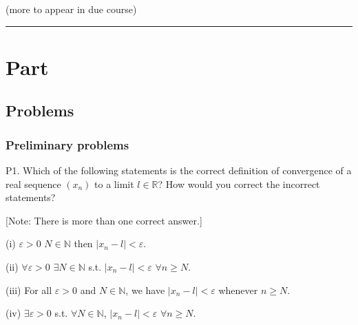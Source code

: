 \documentclass[letterpaper,10pt,english]{jupyterBook}
\begin{document}
\sphinxAtStartPar
{\hyperref[\detokenize{Solutions-upto46:sol}]{}} (more to appear in due course) 
  {\hyperref[\detokenize{Solutions-upto46:ch1sol}]{}} 
  {\hyperref[\detokenize{Solutions-upto46:ch2sol}]{}} 
  {\hyperref[\detokenize{Solutions-upto46:ch3sol}]{}} 
  {\hyperref[\detokenize{Solutions-upto46:ch4sol}]{}} 




\bigskip\hrule\bigskip


\sphinxstepscope


\part{Part}

\sphinxstepscope


\chapter{Problems}
\label{\detokenize{Problems:problems}}\label{\detokenize{Problems:prob}}\label{\detokenize{Problems::doc}}

\section{Preliminary problems}
\label{\detokenize{Problems:preliminary-problems}}\label{\detokenize{Problems:ch1prob}}\label{\detokenize{Problems:p1}}
\sphinxAtStartPar
P1.
Which of the following statements is the correct definition of convergence of a real sequence \((x_n)\) to a limit \(l\in\mathbb{R}\)? How would you correct the incorrect statements?

{[}Note: There is more than one correct answer.{]}

\sphinxAtStartPar
(i) \(\varepsilon>0\) \(N\in\mathbb{N}\) then \(|x_n-l|<\varepsilon\).

\sphinxAtStartPar
(ii) \(\forall\varepsilon>0\) \(\exists N\in\mathbb{N}\) s.t.  \(|x_n-l|<\varepsilon\) \(\forall n\geq N\).

\sphinxAtStartPar
(iii) For all \(\varepsilon>0\) and \(N\in\mathbb{N}\), we have \(|x_n-l|<\varepsilon\) whenever \(n\geq N\).

\sphinxAtStartPar
(iv) \(\exists\varepsilon>0\) s.t. \(\forall N\in\mathbb{N}\), \(|x_n-l|<\varepsilon\) \(\forall n\geq N\).
\end{document}
